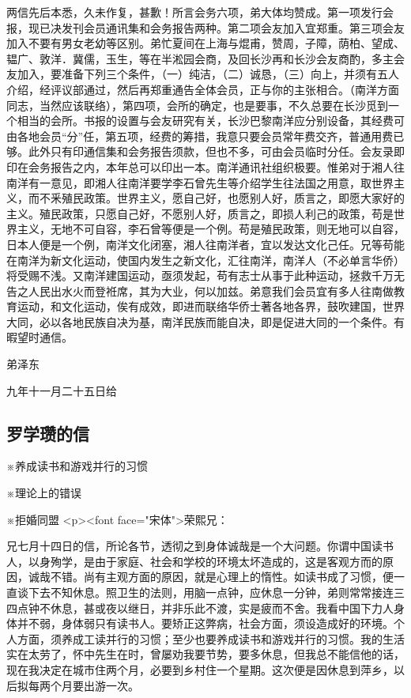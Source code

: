两信先后本悉，久未作复，甚歉！所言会务六项，弟大体均赞成。第一项发行会报，现已决发刊会员通讯集和会务报告两种。第二项会友加入宜郑重。第三项会友加入不要有男女老幼等区别。弟忙夏间在上海与焜甫，赞周，子障，荫柏、望成、韫广、敦洋．冀儒，玉生，等在半淞园会商，及回长沙再和长沙会友商酌，多主会友加入，要准备下列三个条件，（一）纯洁，（二）诚恳，（三）向上，并须有五人介绍，经评议部通过，然后再郑重通告全体会员，正与你的主张相合。（南洋方面同志，当然应该联络），第四项，会所的确定，也是要事，不久总要在长沙觅到一个相当的会所。书报的设置与会友研究有关，长沙巴黎南洋应分别设备，其经费可由各地会员“分”任，第五项，经费的筹措，我意只要会员常年费交齐，普通用费已够。此外只有印通信集和会务报告须款，但也不多，可由会员临时分任。会友录即印在会务报告之内，本年总可以印出一本。南洋通讯社组织极要。惟弟对于湘人往南洋有一意见，即湘人往南洋要学李石曾先生等介绍学生往法国之用意，取世界主义，而不釆殖民政策。世界主义，愿自己好，也愿别人好，质言之，即愿大家好的主义。殖民政策，只愿自己好，不愿别人好，质言之，即损人利己的政策，苟是世界主义，无地不可自容，李石曾等便是一个例。苟是殖民政策，则无地可以自容，日本人便是一个例，南洋文化闭塞，湘人往南洋者，宜以发达文化己任。兄等苟能在南洋为新文化运动，使国内发生之新文化，汇往南洋，南洋人（不必单言华侨）将受赐不浅。又南洋建国运动，亟须发起，苟有志士从事于此种运动，拯救千万无告之人民出水火而登袵席，其为大业，何以加兹。弟意我们会员宜有多人往南做教育运动，和文化运动，俟有成效，即进而联络华侨士著各地各界，鼓吹建国，世界大同，必以各地民族自决为基，南洋民族而能自决，即是促进大同的一个条件。有暇望时通信。

 弟泽东

 九年十一月二十五日给
\subsection{罗学瓒的信}

※养成读书和游戏并行的习惯

※理论上的错误

※拒婚同盟
<p><font face="宋体">荣熙兄：

兄七月十四日的信，所论各节，透彻之到身体诚哉是一个大问题。你谓中国读书人，以身殉学，是由于家庭、社会和学校的环境太坏造成的，这是客观方而的原因，诚哉不错。尚有主观方面的原因，就是心理上的惰性。如读书成了习惯，便一直谈下去不知休息。照卫生的法则，用脑一点钟，应休息一分钟，弟则常常接连三四点钟不休息，甚或夜以继日，并非乐此不渡，实是疲而不舍。我看中国下力人身体并不弱，身体弱只有读书人。要矫正这弊病，社会方面，须设造成好的环境。个人方面，须养成工读并行的习惯；至少也要养成读书和游戏并行的习惯。我的生活实在太劳了，怀中先生在时，曾屡劝我要节势，要多休息，但我总不能信他的话，现在我决定在城市住两个月，必要到乡村住一个星期。这次便是因休息到萍乡，以后拟每两个月要出游一次。

